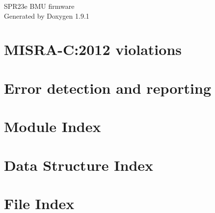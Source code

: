 \let\mypdfximage\pdfximage\def\pdfximage{\immediate\mypdfximage}\documentclass[twoside]{book}
\newcommand{\+}{\discretionary{\mbox{\scriptsize$\hookleftarrow$}}{}{}}
\newcommand{\clearemptydoublepage}{%
  \newpage{\pagestyle{empty}\cleardoublepage}%
}
\begin{document}
\raggedbottom

\hypersetup{pageanchor=false,
             bookmarksnumbered=true,
             pdfencoding=unicode
            }
\begin{titlepage}
\vspace*{7cm}
\begin{center}%
{\Large SPR23e BMU firmware }\\
\vspace*{1cm}
{\large Generated by Doxygen 1.9.1}\\
\end{center}
\end{titlepage}
\clearemptydoublepage
{}
\tableofcontents
\clearemptydoublepage
{}
\hypersetup{pageanchor=true}

\chapter{MISRA-\/C\+:2012 violations}
\label{misra_violations}

\chapter{Error detection and reporting}
\label{_error_detection_and_reporting}

\chapter{Module Index}

\chapter{Data Structure Index}

\chapter{File Index}

\end{document}
